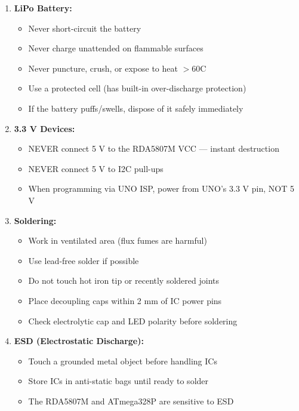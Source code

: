 \documentclass[a4paper,11pt]{article}
\renewcommand*{\,}{ }%
\begin{document}
\begin{dangerbox}
\begin{enumerate}
    \item \textbf{LiPo Battery:}
    \begin{itemize}[noitemsep]
        \item Never short-circuit the battery
        \item Never charge unattended on flammable surfaces
        \item Never puncture, crush, or expose to heat $>$60\textdegree{}C
        \item Use a protected cell (has built-in over-discharge protection)
        \item If the battery puffs/swells, dispose of it safely immediately
    \end{itemize}
    
    \item \textbf{3.3\,V Devices:}
    \begin{itemize}[noitemsep]
        \item NEVER connect 5\,V to the RDA5807M VCC --- instant destruction
        \item NEVER connect 5\,V to I2C pull-ups
        \item When programming via UNO ISP, power from UNO's 3.3\,V pin, NOT 5\,V
    \end{itemize}
    
    \item \textbf{Soldering:}
    \begin{itemize}[noitemsep]
        \item Work in ventilated area (flux fumes are harmful)
        \item Use lead-free solder if possible
        \item Do not touch hot iron tip or recently soldered joints
        \item Place decoupling caps within 2\,mm of IC power pins
        \item Check electrolytic cap and LED polarity before soldering
    \end{itemize}
    
    \item \textbf{ESD (Electrostatic Discharge):}
    \begin{itemize}[noitemsep]
        \item Touch a grounded metal object before handling ICs
        \item Store ICs in anti-static bags until ready to solder
        \item The RDA5807M and ATmega328P are sensitive to ESD
    \end{itemize}
\end{enumerate}
\end{dangerbox}
\end{document}
